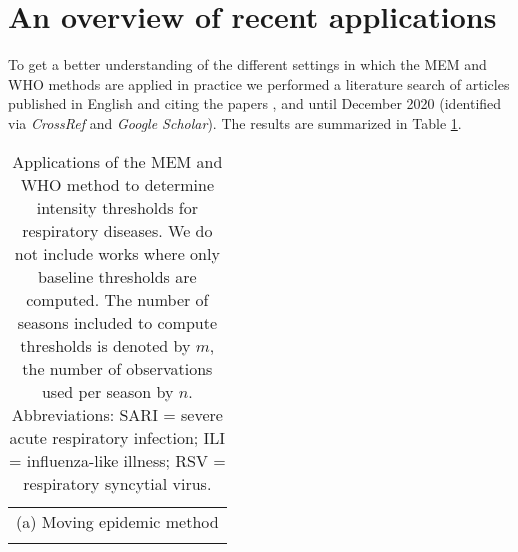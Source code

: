 \documentclass{article}
\begin{document}
\section{An overview of recent applications}
\label{sec:recent_applications}

To get a better understanding of the different settings in which the MEM and WHO methods are applied in practice we performed a literature search of articles published in English and citing the papers \cite{Vega2015}, \cite{WHO2014} and \cite{WHO2017} until December 2020 (identified via \textit{CrossRef} and \textit{Google Scholar}). The results are summarized in Table \ref{tab:literature}. 

\begin{table}[h!]
\caption{Applications of the MEM and WHO method to determine intensity thresholds for respiratory diseases. We do not include works where only baseline thresholds are computed. The number of seasons included to compute thresholds is denoted by $m$, the number of observations used per season by $n$. Abbreviations: SARI = severe acute respiratory infection; ILI = influenza-like illness; RSV = respiratory syncytial virus.}
\label{tab:literature}
\center
\footnotesize
\begin{tabular}{l l l l l l l}
\multicolumn{7}{c}{(a) Moving epidemic method}\\ \\


\end{tabular}
\end{table}
\end{document}
